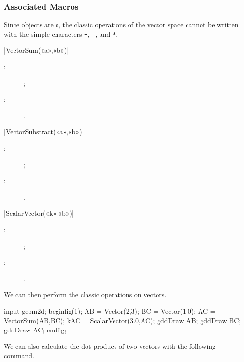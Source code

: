 \documentclass[a4paper,english]{article}
\begin{document}
\subsubsection{Associated Macros}

Since \mpgeomdd objects are s, the classic operations of the
vector space cannot be written with the simple characters \lstinline-+-,
\lstinline+-+, and \lstinline-*-. 

\begin{colourband}
\macro|VectorSum(«a»,«b»)|
\begin{description}
  \item[:]  ;
  \item[:] .
\end{description}
\end{colourband}
\bigskip


\begin{colourband}
\macro|VectorSubstract(«a»,«b»)|
\begin{description}
  \item[:]  ;
  \item[:] .
\end{description}
\end{colourband}
\bigskip


\begin{colourband}
\macro|ScalarVector(«k»,«b»)|
\begin{description}
  \item[:]  ;
  \item[:] .
\end{description}
\end{colourband}
\bigskip

We can then perform the classic operations on vectors.

\begin{ExempleMP}
input geom2d;
beginfig(1);
AB = Vector(2,3);
BC = Vector(1,0);
AC = VectorSum(AB,BC);
kAC = ScalarVector(3.0,AC);
gddDraw AB;
gddDraw BC;
gddDraw AC;
endfig;
\end{ExempleMP}

We can also calculate the dot product of two vectors with the following command.
\end{document}

